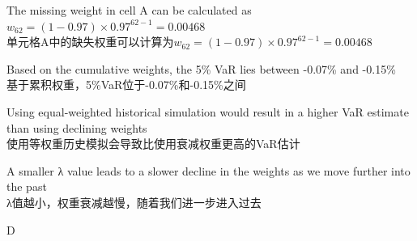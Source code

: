 \documentclass{article}
\begin{document}
\begin{choices}
    \item The missing weight in cell A can be calculated as \(w_{62} = (1-0.97) \times 0.97^{62-1} = 0.00468\)\\
    单元格A中的缺失权重可以计算为\(w_{62} = (1-0.97) \times 0.97^{62-1} = 0.00468\)
    
    \item Based on the cumulative weights, the 5\% VaR lies between -0.07\% and -0.15\%\\
    基于累积权重，5\%VaR位于-0.07\%和-0.15\%之间
    
    \item Using equal-weighted historical simulation would result in a higher VaR estimate than using declining weights\\
    使用等权重历史模拟会导致比使用衰减权重更高的VaR估计
    
    \item A smaller λ value leads to a slower decline in the weights as we move further into the past\\
    λ值越小，权重衰减越慢，随着我们进一步进入过去
\end{choices}

\begin{correctanswer}
    D
\end{correctanswer}
\end{document}
